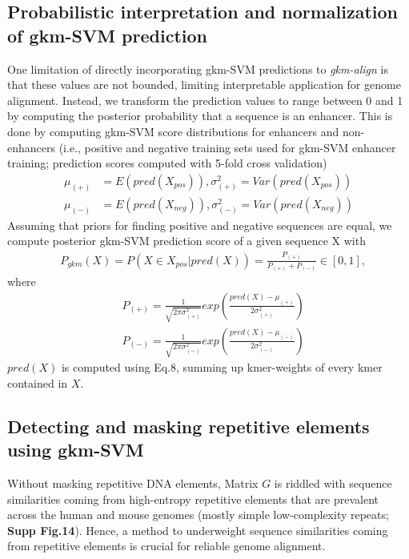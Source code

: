 \documentclass[english]{article}
\begin{document}
  \subsection{Probabilistic interpretation and normalization of gkm-SVM prediction}
 One limitation of directly incorporating gkm-SVM predictions to \textit{gkm-align} is that these values are not bounded, limiting interpretable application for genome alignment. Instead, we transform the prediction values to range between 0 and 1 by computing the posterior probability that a sequence is an enhancer. This is done by computing gkm-SVM score distributions for enhancers and non-enhancers (i.e., positive and negative training sets used for gkm-SVM enhancer training; prediction scores computed with 5-fold cross validation)
 \begin{align*}
     \mu_{(+)} &= E(pred(X_{pos})), \sigma^2_{(+)} = Var(pred(X_{pos}))\\
     \mu_{(-)} &= E(pred(X_{neg})), \sigma^2_{(-)} = Var(pred(X_{neg}))
 \end{align*}
Assuming that priors for finding positive and negative sequences are equal, we compute posterior gkm-SVM prediction score of a given sequence X with
 \begin{align*}
     &P_{gkm}(X) = P(X\in X_{pos}|pred(X))= \frac{P_{(+)}}{P_{(+)} + P_{(-)}} \in [0,1], \tag{Eq.9} 
\end{align*}
where
\begin{align*}
     &P_{(+)} = \frac{1}{\sqrt{2\pi \sigma_{(+)}^2}}exp(\frac{pred(X)-\mu_{(+)}}{2\sigma_{(+)}^2})\\ 
     &P_{(-)} = \frac{1}{\sqrt{2\pi \sigma_{(-)}^2}}exp(\frac{pred(X)-\mu_{(-)}}{2\sigma_{(-)}^2})
 \end{align*}
$pred(X)$ is computed using Eq.8, summing up kmer-weights of every kmer contained in $X$.





 
\subsection{Detecting and masking repetitive elements using gkm-SVM}

Without masking repetitive DNA elements, Matrix  $G$ is riddled with sequence similarities coming from high-entropy repetitive elements that are prevalent across the human and mouse genomes (mostly simple low-complexity repeats; \textbf{Supp Fig.14}). Hence, a method to underweight sequence similarities coming from repetitive elements is crucial for reliable genome alignment. 
\end{document}
